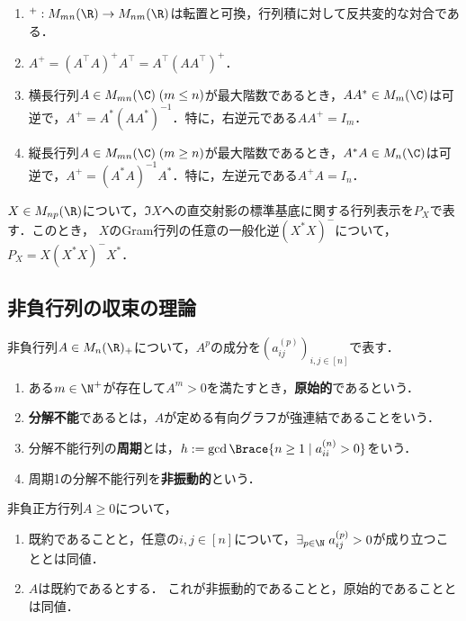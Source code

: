 \documentclass[uplatex,dvipdfmx]{jsarticle}
\begin{document}
\begin{proposition}\mbox{}\label{prop-example-of-Moore-Penrose-inverse}
    \begin{enumerate}
        \item ${}^+:M_{mn}(\R)\to M_{nm}(\R)$は転置と可換，行列積に対して反共変的な対合である．
        \item $A^+=(A^\top A)^+A^\top=A^\top(AA^\top)^+$．
        \item 横長行列$A\in M_{mn}(\C)\;(m\le n)$が最大階数であるとき，$AA^*\in M_m(\C)$は可逆で，$A^+=A^*(AA^*)^{-1}$．特に，右逆元である$AA^+=I_m$．
        \item 縦長行列$A\in M_{mn}(\C)\;(m\ge n)$が最大階数であるとき，$A^*A\in M_n(\C)$は可逆で，$A^+=(A^*A)^{-1}A^*$．特に，左逆元である$A^+A=I_n$．
    \end{enumerate}
\end{proposition}

\begin{theorem}[直交射影の一般化逆行列による表示]\label{thm-projection-by-generalized-inverse}
    $X\in M_{np}(\R)$について，$\Im X$への直交射影の標準基底に関する行列表示を$P_X$で表す．このとき，
    $X$のGram行列の任意の一般化逆$(X^*X)^-$について，
    $P_X=X(X^*X)^-X^*$．
\end{theorem}

\subsection{非負行列の収束の理論}

\begin{definition}
    非負行列$A\in M_n(\R)_+$について，$A^p$の成分を$(a_{ij}^{(p)})_{i,j\in[n]}$で表す．
    \begin{enumerate}
        \item ある$m\in\N^+$が存在して$A^m>0$を満たすとき，\textbf{原始的}であるという．
        \item \textbf{分解不能}であるとは，$A$が定める有向グラフが強連結であることをいう．
        \item 分解不能行列の\textbf{周期}とは，$h:=\gcd\Brace{n\ge1\mid a_{ii}^{(n)}>0}$をいう．
        \item 周期1の分解不能行列を\textbf{非振動的}という．
    \end{enumerate}
\end{definition}

\begin{lemma}
    非負正方行列$A\ge0$について，
    \begin{enumerate}
        \item 既約であることと，任意の$i,j\in[n]$について，$\exists_{p\in\N}\;a_{ij}^{(p)}>0$が成り立つこととは同値．
        \item $A$は既約であるとする．
        これが非振動的であることと，原始的であることとは同値．
    \end{enumerate}
\end{lemma}
\end{document}

